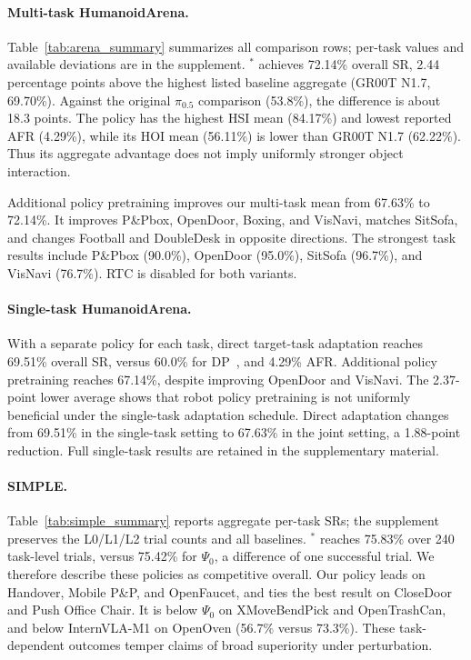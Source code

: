 \paragraph{Multi-task HumanoidArena.}
Table~\ref{tab:arena_summary} summarizes all comparison rows; per-task values and available deviations are in the supplement. \ours$^{*}$ achieves 72.14\% overall SR, 2.44 percentage points above the highest listed baseline aggregate (GR00T N1.7, 69.70\%). Against the original $\pi_{0.5}$ comparison (53.8\%), the difference is about 18.3 points. The policy has the highest HSI mean (84.17\%) and lowest reported AFR (4.29\%), while its HOI mean (56.11\%) is lower than GR00T N1.7 (62.22\%). Thus its aggregate advantage does not imply uniformly stronger object interaction.

Additional policy pretraining improves our multi-task mean from 67.63\% to 72.14\%. It improves P\&Pbox, OpenDoor, Boxing, and VisNavi, matches SitSofa, and changes Football and DoubleDesk in opposite directions. The strongest task results include P\&Pbox (90.0\%), OpenDoor (95.0\%), SitSofa (96.7\%), and VisNavi (76.7\%). RTC is disabled for both variants.



\paragraph{Single-task HumanoidArena.}
With a separate policy for each task, direct target-task adaptation reaches 69.51\% overall SR, versus 60.0\% for DP~\cite{chi2023diffusionpolicy}, and 4.29\% AFR. Additional policy pretraining reaches 67.14\%, despite improving OpenDoor and VisNavi. The 2.37-point lower average shows that robot policy pretraining is not uniformly beneficial under the single-task adaptation schedule. Direct adaptation changes from 69.51\% in the single-task setting to 67.63\% in the joint setting, a 1.88-point reduction. Full single-task results are retained in the supplementary material.

\paragraph{SIMPLE.}
Table~\ref{tab:simple_summary} reports aggregate per-task SRs; the supplement preserves the L0/L1/L2 trial counts and all baselines. \ours$^{*}$ reaches 75.83\% over 240 task-level trials, versus 75.42\% for $\Psi_0$, a difference of one successful trial. We therefore describe these policies as competitive overall. Our policy leads on Handover, Mobile P\&P, and OpenFaucet, and ties the best result on CloseDoor and Push Office Chair. It is below $\Psi_0$ on XMoveBendPick and OpenTrashCan, and below InternVLA-M1 on OpenOven (56.7\% versus 73.3\%). These task-dependent outcomes temper claims of broad superiority under perturbation.


